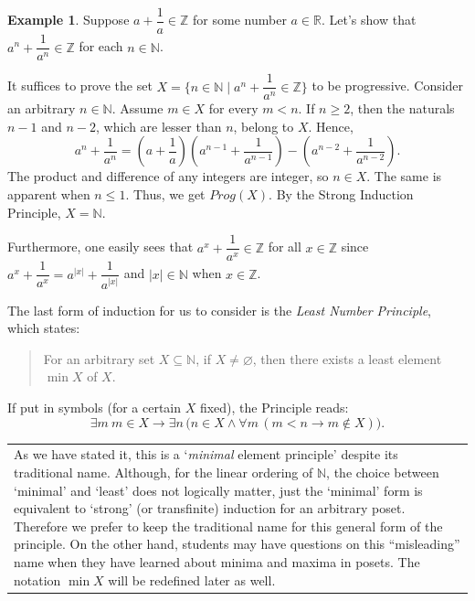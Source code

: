 \documentclass[12pt,notitlepage]{article}
\theoremstyle{plain}
\theoremstyle{definition}
\newtheorem{exm}[thm]{Example}
\theoremstyle{plain}
\newcommand{\N}{\mathbb{N}}
\newcommand{\sbs}{\subseteq}
\newcommand{\void}{\varnothing}
\newcommand{\1}{\mathbf{1}}
\newcommand{\0}{\mathbf{0}}
\newcommand{\mcomm}[1]{
\medskip\noindent\begin{tabular}{| l}
\parbox{0.99\textwidth}{{\small
#1 }}\end{tabular}
\smallskip}
\begin{document}
\begin{exm}
Suppose $a + \dfrac{1}{a} \in \mathbb{Z}$ for some number $a \in \mathbb{R}$. Let's show that $a^n + \dfrac{1}{a^n} \in \mathbb{Z}$ for each $n \in \N$.

It suffices to prove the set $X = \{n \in \N \mid a^n + \dfrac{1}{a^n} \in \mathbb{Z}\}$ to be progressive. Consider an arbitrary $n \in \N$. Assume $m \in X$ for every $m < n$. If $n \geq 2$, then the naturals $n - 1$ and $n - 2$, which are lesser than $n$, belong to $X$. Hence,
$$a^n + \dfrac{1}{a^n} = \left (a + \dfrac{1}{a}\right)\left (a^{n-1} + \dfrac{1}{a^{n-1}} \right) - \left (a^{n-2} + \dfrac{1}{a^{n-2}} \right).$$
The product and difference of any integers are integer, so $n \in X$. The same is apparent when $n \leq 1$. Thus, we get $Prog(X)$. By the Strong Induction Principle, $X = \N$.

Furthermore, one easily sees that $a^x + \dfrac{1}{a^x} \in \mathbb{Z}$ for all $x \in \mathbb{Z}$ since $a^x + \dfrac{1}{a^x} = a^{|x|} + \dfrac{1}{a^{|x|}}$ and $|x| \in \N$ when $x \in \mathbb{Z}$.
\end{exm}

The last form of induction for us to consider is the \emph{Least Number Principle}, which states:
\begin{quote}
For an arbitrary set $X \sbs \N$, if $X \neq \void$, then there exists a least element $\min X$ of $X$.
\end{quote}
If put in symbols (for a certain $X$ fixed), the Principle reads:
$$\exists m\  m \in X \to \exists n\, \bigl(n \in X \wedge \forall m\, (m < n \to  m \notin X)\bigr).$$
\mcomm{As we have stated it, this is a `\emph{minimal} element principle' despite its traditional name. Although, for the linear ordering of $\N$, the choice between `minimal' and `least' does not logically matter, just the `minimal' form is equivalent to `strong' (or transfinite) induction for an arbitrary poset. Therefore we prefer to keep the traditional name for this general form of the principle. On the other hand, students may have questions on this ``misleading'' name when they have learned about minima and maxima in posets. The notation $\min X$ will be redefined later as well.}
\end{document}
